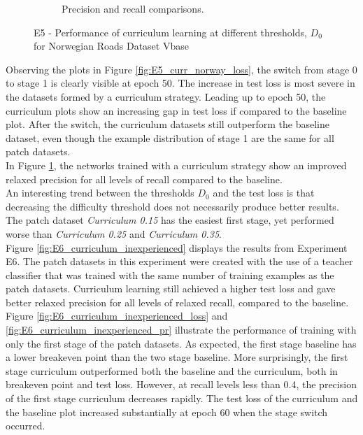 \begin{figure}[h]
\begin{subfigure}{0.5\textwidth}
\caption{Precision and recall comparisons.} \label{fig:E5_curr_norway_pr}
\end{subfigure}
\hspace*{\fill} %
\caption[E5 - Performance of curriculum learning for Norwegian Roads Dataset Vbase]{E5 - Performance of curriculum learning at different thresholds, $D_{0}$ for Norwegian Roads Dataset Vbase} \label{fig:E5_curriculum_norway}
\end{figure}

Observing the plots in Figure \ref{fig:E5_curr_norway_loss}, the switch from stage 0 to stage 1 is clearly visible at epoch 50. The increase in test loss is most severe in the datasets formed by a curriculum strategy. Leading up to epoch 50, the curriculum plots show an increasing gap in test loss if compared to the baseline plot. After the switch, the curriculum datasets still outperform the baseline dataset, even though the example distribution of stage 1 are the same for all patch datasets.\\

In Figure \ref{fig:E5_curr_norway_pr}, the networks trained with a curriculum strategy show an improved relaxed precision for all levels of recall compared to the baseline.\\

An interesting trend between the thresholds $D_0$ and the test loss is that decreasing the difficulty threshold does not necessarily produce better results. The patch dataset \textit{Curriculum 0.15} has the easiest first stage, yet performed worse than \textit{Curriculum 0.25} and \textit{Curriculum 0.35}.\\

Figure \ref{fig:E6_curriculum_inexperienced} displays the results from Experiment E6. The patch datasets in this experiment were created with the use of a teacher classifier that was trained with the same number of training examples as the patch datasets. Curriculum learning still achieved a higher test loss and gave better relaxed precision for all levels of relaxed recall, compared to the baseline.\\

Figure \ref{fig:E6_curriculum_inexperienced_loss} and \ref{fig:E6_curriculum_inexperienced_pr} illustrate the performance of training with only the first stage of the patch datasets. As expected, the first stage baseline has a lower breakeven point than the two stage baseline. More surprisingly, the first stage curriculum outperformed both the baseline and the curriculum, both in breakeven point and test loss. However, at recall levels less than 0.4, the precision of the first stage curriculum decreases rapidly. The test loss of the curriculum and the baseline plot  increased substantially at epoch 60 when the stage switch occurred. \\

